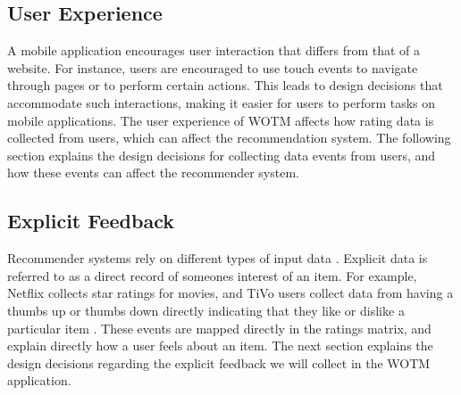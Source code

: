 


\subsection{User Experience}

A mobile application encourages user interaction that differs from that of a website. For instance, users are encouraged to use touch events to navigate through pages or to perform certain actions. This leads to design decisions that accommodate such interactions, making it easier for users to perform tasks on mobile applications. The user experience of WOTM affects how rating data is collected from users, which can affect the recommendation system. The following section explains the design decisions for collecting data events from users, and how these events can affect the recommender system. 

\subsection{Explicit Feedback}

Recommender systems rely on different types of input data \cite{koren2009matrix}. Explicit data is referred to as a direct record of someones interest of an item. For example, Netflix collects star ratings for movies, and TiVo users collect data from having a thumbs up or thumbs down directly indicating that they like or dislike a particular item \cite{koren2009matrix}. These events are mapped directly in the ratings matrix, and explain directly how a user feels about an item. 
The next section explains the design decisions regarding the explicit feedback we will collect in the WOTM application.

